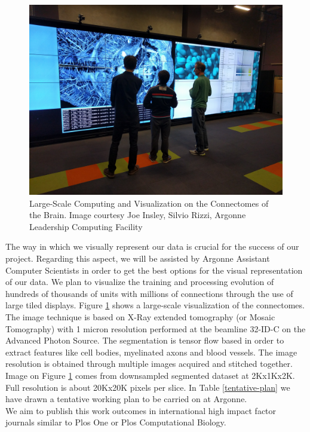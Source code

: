 \documentclass[11pt,a4paper]{article}
\begin{document}
\begin{figure}[h!]
  \includegraphics[width=\linewidth]{visualization.jpg}
  \caption{Large-Scale Computing and Visualization on the Connectomes of the Brain. %
  Image courtesy Joe Insley, Silvio Rizzi, Argonne Leadership Computing Facility}
  \label{connectome}
\end{figure}

The way in which we visually represent our data is crucial for the success of
our project.
Regarding this aspect, we will be assisted by Argonne Assistant Computer Scientists
in order to get the best options for the visual representation of our data.
We plan to visualize the training and processing evolution of hundreds of thousands
of units with millions of connections through the use of large tiled displays.
Figure \ref{connectome} shows a large-scale visualization of the connectomes.
The image technique is based on X-Ray extended tomography (or Mosaic Tomography)
with 1 micron resolution performed at the beamline 32-ID-C on the Advanced Photon Source.
The segmentation is tensor flow based in order to 
extract features like cell bodies, myelinated axons and blood vessels.
The image resolution is obtained through multiple images acquired
and stitched together. Image on Figure \ref{connectome} comes from
downsampled segmented dataset at 2Kx1Kx2K.
Full resolution is about 20Kx20K pixels per slice. 
In Table \ref{tentative-plan} we have drawn a tentative working plan to be carried on
at Argonne. \\

We aim to publish this work outcomes in international high impact factor journals 
similar to Plos One or Plos Computational Biology. \\
\end{document}
